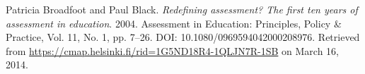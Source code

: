 \begin{thebibliography}{9}














Patricia Broadfoot and Paul Black. \emph{Redefining assessment? The first ten
years of assessment in education}. 2004. Assessment in Education: Principles,
Policy \& Practice, Vol. 11, No. 1, pp. 7--26. DOI:
10.1080/0969594042000208976. Retrieved from
\url{https://cmap.helsinki.fi/rid=1G5ND18R4-1QLJN7R-1SB} on March 16, 2014.


\end{thebibliography}
